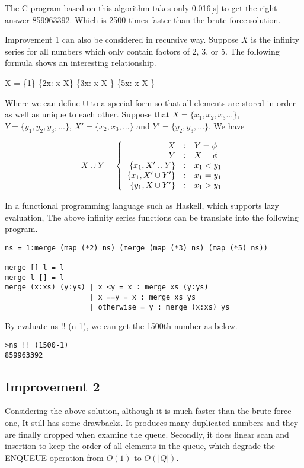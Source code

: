 \documentclass{article}
\begin{document}
The C program based on this algorithm takes only 0.016[s] to get the right answer
859963392. Which is 2500 times faster than the brute force solution.

Improvement 1 can also be considered in recursive way. Suppose $X$ is the infinity
series for all numbers which only contain factors of 2, 3, or 5. The following
formula shows an interesting relationship.

\be
  X = \{1\} \cup \{2x: \forall x \in X\} \cup \{3x: \forall x \in X \} \cup \{5x: \forall x \in X \}
\ee

Where we can define $\cup$ to a special form so that all elements are stored in order
as well as unique to each other. Suppose that $X=\{x_1, x_2, x_3...\}$, $Y=\{y_1, y_2, y_3, ...\}$, $X' = \{x_2, x_3, ...\}$ and $Y'=\{y_2, y_3, ...\}$. We have

\[
X \cup Y = \left \{
  \begin{array}{r@{\quad:\quad}l}
  X & Y = \phi \\
  Y & X = \phi \\
  \{ x_1, X' \cup Y \} & x_1 < y_1 \\
  \{ x_1, X' \cup Y' \} & x_1 = y_1 \\
  \{ y_1, X \cup Y' \} & x_1 > y_1
  \end{array}
\right.
\]

In a functional programming language such as Haskell, which supports
lazy evaluation, The above infinity series functions can be translate
into the following program.

\lstset{language=Haskell}
\begin{lstlisting}
ns = 1:merge (map (*2) ns) (merge (map (*3) ns) (map (*5) ns))

merge [] l = l
merge l [] = l
merge (x:xs) (y:ys) | x <y = x : merge xs (y:ys)
                    | x ==y = x : merge xs ys
                    | otherwise = y : merge (x:xs) ys
\end{lstlisting}

By evaluate ns !! (n-1), we can get the 1500th number as
below.

\begin{verbatim}
>ns !! (1500-1)
859963392
\end{verbatim}

\subsection{Improvement 2}
Considering the above solution, although it is much faster than the brute-force one,
It still has some drawbacks. It produces many duplicated numbers and they are
finally dropped when examine the queue. Secondly, it does linear scan and insertion
to keep the order of all elements in the queue, which degrade the ENQUEUE operation
from $O(1)$ to $O(|Q|)$.
\end{document}
